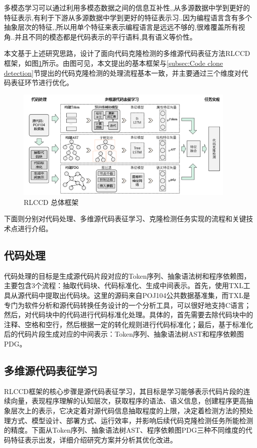 多模态学习可以通过利用多模态数据之间的信息互补性,,从多源数据中学到更好的特征表示,有利于下游从多源数据中学到更好的特征表示习..因为编程语言含有多个抽象层次的特征,,所以用单个特征来表示编程语言是远远不够的,很难覆盖所有视角..并且不同的模态都是代码表示的平行语料,具有语义等价性。

本文基于上述研究思路，设计了面向代码克隆检测的多维源代码表征方法RLCCD框架，如图\ref{fig:framework}所示。由图可见，本文提出的基本框架与\ref{subsec:Code clone detection}节提出的代码克隆检测的处理流程基本一致，并主要通过三个维度对代码表征环节进行优化。

\begin{figure}[H]
    \centering
    \includegraphics[width=0.95\textwidth]{figures/framework}
    \caption{RLCCD 总体框架}
    \label{fig:framework}
\end{figure}

下面则分别对代码处理、多维源代码表征学习、克隆检测任务实现的流程和关键技术点进行介绍。

\subsection{代码处理}
\label{subsec:Preprocess}
代码处理的目标是生成源代码片段对应的Token序列、抽象语法树和程序依赖图，主要包含3个流程：抽取代码块、代码标准化、生成中间表示。首先，使用TXL工具从源代码中提取出代码块。这里的源码来自POJ104公共数据基准集，而TXL是专门为软件分析和源代码转换任务设计的一个分析工具，可以很好地支持C语言；然后，对代码块中的代码进行代码标准化处理。具体的，首先需要去除代码块中的注释、空格和空行，然后根据一定的转化规则进行代码标准化；最后，基于标准化后的代码片段生成对应的中间表示：Token序列、抽象语法树AST和程序依赖图PDG。

\subsection{多维源代码表征学习}
\label{subsec:Representation}
RLCCD框架的核心步骤是源代码表征学习，其目标是学习能够表示代码片段的连续向量，表现程序理解的认知层次，获取程序的语法、语义信息，创建程序更高抽象层次上的表示，它决定着对源代码信息抽取程度的上限，决定着检测方法的预处理方式、模型设计、部署方式、运行效率，并影响后续代码克隆检测任务所能检测的精度。下面从Token序列、抽象语法树AST、程序依赖图PDG三种不同维度的代码特征表示出发，详细介绍研究方案并分析其优化改进。

